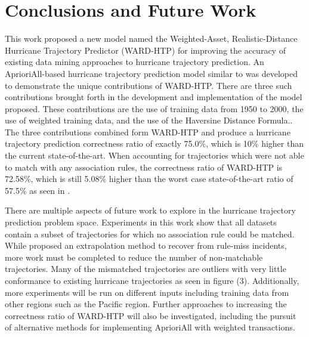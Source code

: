 \documentclass[12pt,conference]{IEEEtran}
\begin{document}
\section{Conclusions and Future Work}

This work proposed a new model named the Weighted-Asset, Realistic-Distance Hurricane Trajectory Predictor (WARD-HTP) for improving the accuracy of existing data mining approaches to hurricane trajectory prediction. An AprioriAll-based hurricane trajectory prediction model similar to \cite{major-hurricane-model} was developed to demonstrate the unique contributions of WARD-HTP. There are three such contributions brought forth in the development and implementation of the model proposed. These contributions are the use of training data from 1950 to 2000, the use of weighted training data, and the use of the Haversine Distance Formula.. The three contributions combined form WARD-HTP and produce a hurricane trajectory prediction correctness ratio of exactly 75.0\%, which is 10\% higher than the current state-of-the-art. When accounting for trajectories which were not able to match with any association rules, the correctness ratio of WARD-HTP is 72.58\%, which is still 5.08\% higher than the worst case state-of-the-art ratio of 57.5\% as seen in \cite{major-hurricane-model}.

There are multiple aspects of future work to explore in the hurricane trajectory prediction problem space. Experiments in this work show that all datasets contain a subset of trajectories for which no association rule could be matched. While \cite{major-hurricane-model} proposed an extrapolation method to recover from rule-miss incidents, more work must be completed to reduce the number of non-matchable trajectories. Many of the mismatched trajectories are outliers with very little conformance to existing hurricane trajectories as seen in figure (3). Additionally, more experiments will be run on different inputs including training data from other regions such as the Pacific region. Further approaches to increasing the correctness ratio of WARD-HTP will also be investigated, including the pursuit of alternative methods for implementing AprioriAll with weighted transactions.
\end{document}
